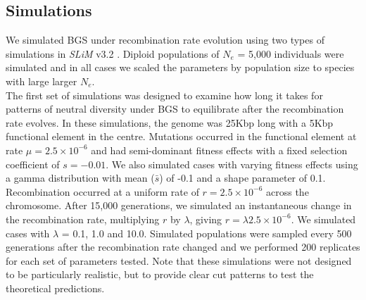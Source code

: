\documentclass[11pt,twoside, onecolumn]{GSA_format}
\begin{document}
\subsection{Simulations}

We simulated BGS under recombination rate evolution using two types of simulations in \textit{SLiM} v3.2 \citep{Haller2019-jv}. Diploid populations of $N_e$ = 5,000 individuals were simulated and in all  cases we scaled the parameters by population size to species with large larger $N_e$. \\


The first set of simulations was designed to examine how long it takes for patterns of neutral diversity under BGS to equilibrate after the recombination rate evolves. In these simulations, the genome was 25Kbp long with a 5Kbp functional element in the centre. Mutations occurred in the functional element at rate $\mu = 2.5\times10^{-6}$ and had semi-dominant fitness effects with a fixed selection coefficient of $s = -0.01$. We also simulated cases with varying fitness effects using a gamma distribution with mean ($\bar{s}$) of -0.1 and a shape parameter of 0.1. Recombination occurred at a uniform rate of $r = 2.5\times10^{-6}$ across the chromosome. After 15,000 generations, we simulated an instantaneous change in the recombination rate, multiplying $r$ by $\lambda$, giving $r = \lambda2.5\times10^{-6}$. We simulated cases with $\lambda$ = 0.1, 1.0 and 10.0. Simulated populations were sampled every 500 generations after the recombination rate changed and we performed 200 replicates for each set of parameters tested. Note that these simulations were not designed to be particularly realistic, but to provide clear cut patterns to test the theoretical predictions. \\
\end{document}
